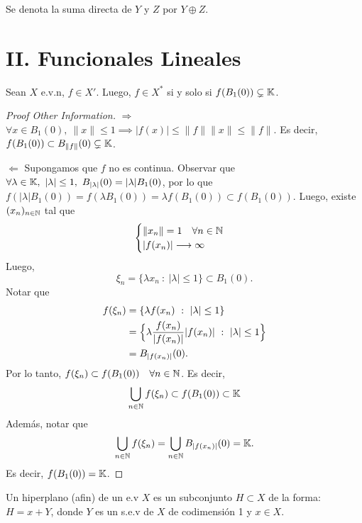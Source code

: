 
Se denota la suma directa de $Y$ y $Z$ por $Y \oplus Z$.

\section{II. Funcionales Lineales}

\begin{prop}
	Sean $X$ e.v.n, $f \in X'$. Luego, $f \in X^{*}$ si y solo si $f(B_{1}(0)) \subsetneq \mathbb{K}$.
\end{prop}
\begin{proof}[Proof Other Information]
	$\boxed{\Rightarrow}$ $\forall x \in B_{1}(0),\ \| x \| \leq 1 \implies |f(x)| \leq \| f \| \| x \| \leq \| f \|$. Es decir, $f(B_{1}(0)) \subset B_{\| f \|}(0) \subsetneq \mathbb{K}$. \par
	$\boxed{\Leftarrow}$ Supongamos que $f$ no es continua. Observar que $\forall \lambda \in \mathbb{K},\ |\lambda| \leq 1,\ B_{|\lambda|}(0) = |\lambda| B_{1}(0)$, por lo que $f(|\lambda| B_{1}(0)) = f(\lambda B_{1}(0)) = \lambda f(B_{1}(0)) \subset f(B_{1}(0))$. Luego, existe $(x_{n})_{n \in \mathbb{N}}$ tal que
	\[ \begin{cases}
		\| x_{n} \| = 1 \quad \forall n \in \mathbb{N} \\
		|f(x_{n})| \longrightarrow \infty
	\end{cases} \]
	Luego,
	\[ \xi_{n} = \{\lambda x_{n} \ : \ |\lambda| \leq 1\} \subset B_{1}(0). \]
	Notar que
	\begin{align*}
		f(\xi_{n}) &= \{\lambda f(x_{n}) \ : \ |\lambda| \leq 1\} \\
		&= \Big{\{}\lambda \frac{f(x_{n})}{|f(x_{n})|} |f(x_{n})| \ : \ |\lambda| \leq 1 \Big{\}} \\
		&= B_{|f(x_{n})|}(0)
	.\end{align*}
	Por lo tanto, $f(\xi_{n}) \subset f(B_{1}(0)) \quad \forall n \in \mathbb{N}$. Es decir,
	\[ \bigcup_{n \in \mathbb{N}} f(\xi_{n}) \subset f(B_{1}(0)) \subset \mathbb{K} \]
	Además, notar que
	\[ \bigcup_{n \in \mathbb{N}} f(\xi_{n}) = \bigcup_{n \in \mathbb{N}} B_{|f(x_{n})|}(0) = \mathbb{K}. \]
	Es decir, $f(B_{1}(0)) = \mathbb{K}$.
\end{proof}

\begin{definition}[hiperplano]
	Un hiperplano (afin) de un e.v $X$ es un subconjunto $H \subset X$ de la forma: $H = x + Y$, donde $Y$ es un s.e.v de $X$ de codimensión 1 y $x \in X$.
\end{definition}

